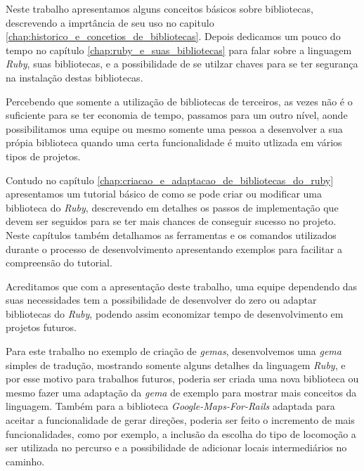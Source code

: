 Neste trabalho apresentamos alguns conceitos básicos sobre bibliotecas, descrevendo a imprtância de seu
uso no capitulo \ref{chap:historico_e_concetios_de_bibliotecas}. Depois dedicamos um pouco do tempo
no capítulo \ref{chap:ruby_e_suas_bibliotecas} para falar sobre a linguagem \emph{Ruby}, suas
bibliotecas, e a possibilidade de se utilzar chaves para se ter segurança na instalação destas bibliotecas.

Percebendo que somente a utilização de bibliotecas de terceiros, as vezes não é o suficiente para se
ter economia de tempo, passamos para um outro nível, aonde possibilitamos uma equipe ou mesmo somente
uma pessoa a desenvolver a sua própia biblioteca quando uma certa funcionalidade é muito utlizada em vários
tipos de projetos.

Contudo no capítulo \ref{chap:criacao_e_adaptacao_de_bibliotecas_do_ruby} apresentamos um tutorial
básico de como se pode criar ou modificar uma biblioteca do \emph{Ruby}, descrevendo em detalhes os
passos de implementação que devem ser seguidos para se ter mais chances de conseguir sucesso no
projeto. Neste capítulos também detalhamos as ferramentas e os comandos utilizados durante o processo de
desenvolvimento apresentando exemplos para facilitar a compreensão do tutorial.

Acreditamos que com a apresentação deste trabalho, uma equipe dependendo das suas necessidades tem
a possibilidade de desenvolver do zero ou adaptar bibliotecas do \emph{Ruby}, podendo assim
economizar tempo de desenvolvimento em projetos futuros.

Para este trabalho no exemplo de criação de \emph{gemas}, desenvolvemos uma \emph{gema} simples de
tradução, mostrando somente alguns detalhes da linguagem \emph{Ruby}, e por esse motivo para
trabalhos futuros, poderia ser criada uma nova biblioteca ou mesmo fazer uma adaptação da
\emph{gema} de exemplo para mostrar mais conceitos da linguagem. Também para a biblioteca
\emph{Google-Maps-For-Rails} adaptada para aceitar a funcionalidade de gerar direções, poderia ser feito o
incremento de mais funcionalidades, como por exemplo, a inclusão da escolha do tipo de locomoção a ser
utilizada no percurso e a possibilidade de adicionar locais intermediários no caminho.
